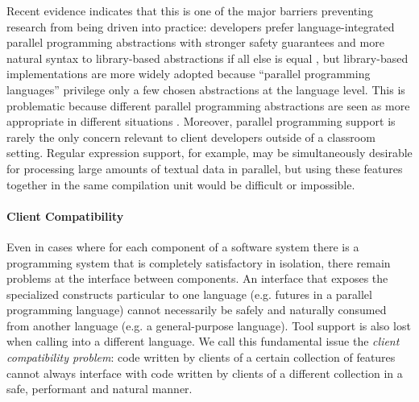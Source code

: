 Recent evidence indicates that this is one of the major barriers preventing research from being driven into practice: developers prefer language-integrated parallel programming abstractions with stronger safety guarantees and more natural syntax to library-based abstractions if all else is equal \cite{cave2010comparing}, but library-based implementations are more widely adopted because ``parallel programming languages'' privilege only a few chosen  abstractions at the language level. This is problematic because different parallel programming abstractions are seen as more appropriate in different situations \cite{Tasharofi:2013rc}. Moreover,  parallel programming support is rarely the only concern relevant to client developers outside of a classroom setting. Regular expression support, for example, may be simultaneously desirable for processing large amounts of textual data in parallel, but using these features together in the same compilation unit would be difficult or impossible.  %



\paragraph{Client Compatibility} Even in cases where for each component of a software system there is a programming system that is completely satisfactory in isolation, there remain problems at the interface between components. An interface that exposes the specialized constructs particular to one language (e.g. futures in a parallel programming language) cannot necessarily be safely and naturally consumed from another language (e.g. a general-purpose language). Tool support is also lost when calling into a different language. We call this fundamental issue the \emph{client compatibility problem}: code written by clients of a certain collection of features cannot always interface with code written by clients of a different collection  in a safe, performant and natural manner.


